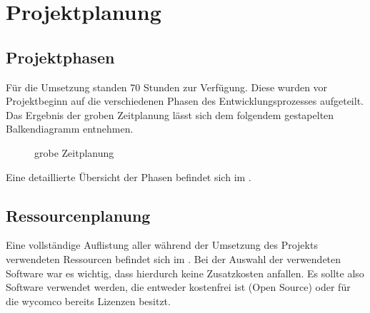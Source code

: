 \section{Projektplanung} 
\label{sec:Projektplanung}
\subsection{Projektphasen}
\label{sec:Projektphasen}
Für die Umsetzung standen 70 Stunden zur Verfügung. Diese wurden vor Projektbeginn auf die verschiedenen Phasen des Entwicklungsprozesses aufgeteilt. 
Das Ergebnis der groben Zeitplanung lässt sich dem folgendem gestapelten Balkendiagramm entnehmen. 
\begin{figure}[htb]
\centering
{}
\caption{grobe Zeitplanung}
\end{figure}
Eine detaillierte Übersicht der Phasen befindet sich im .
\subsection{Ressourcenplanung}
\label{sec:Ressourcenplanung}

Eine vollständige Auflistung aller während der Umsetzung des Projekts verwendeten Ressourcen befindet sich im . Bei der Auswahl der verwendeten Software war es wichtig, dass hierdurch keine Zusatzkosten anfallen. Es sollte also Software verwendet werden, die entweder kostenfrei ist (\zB Open Source) oder für die wycomco bereits Lizenzen besitzt.
